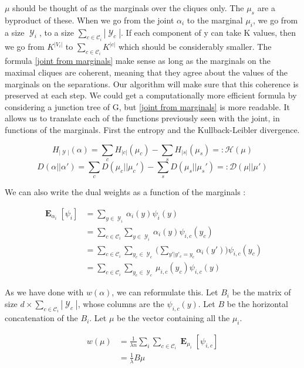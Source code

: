 \documentclass{article}
\DeclareMathOperator{\E}{\mathbf{E}}
\DeclareMathOperator{\Y}{\mathcal{Y}}
\begin{document}
$\mu$ should be thought of as the marginals over the cliques only. The $\mu_s$ are a byproduct of these. When we go from the joint $\alpha_i$ to the marginal $\mu_i$, we go from a size $\Y_i$, to a size $\sum_{c \in \mathcal C_i} |\Y_c|$. If each component of y can take K values, then we go from $K^{|V_i|}$ to $\sum_{c \in \mathcal C_i} K^{|c|}$ which should be considerably smaller.
The formula \ref{joint from marginals} make sense as long as the marginals on the maximal cliques are coherent, meaning that they agree about the values of the marginals on the separations. Our algorithm will make sure that this coherence is preserved at each step.
 We could get a computationally more efficient formula by considering a junction tree of G, but  \ref{joint from marginals} is more readable. It allows us to translate each of the functions previously seen with the joint, in functions of the marginals. First the entropy and the Kullback-Leibler divergence.

\begin{equation}
	H_{|\Y|} (\alpha) = \sum_c H_{|c|}(\mu_c) - \sum_s H_{|s|}(\mu_s) =: \mathcal H (\mu) 
	\label{marginals entropy}
\end{equation}
\begin{equation}
	D(\alpha||\alpha') = \sum_c D(\mu_c||\mu_c') - \sum_s D(\mu_s||\mu_s') =: \mathcal D (\mu||\mu')
\end{equation}

We can also write the dual weights as a function of the marginals :

\begin{align*}
	   \E_{\alpha_i}[\psi_i]
   & = \sum_{y \in \Y_i} \alpha_i(y) \psi_i(y)  \\
   &  = \sum_{c \in \mathcal C_i} \sum_{y \in \Y_i}  \alpha_i(y)  \psi_{i, c}(y_c)  \\
   & = \sum_{c \in \mathcal C_i}\sum_{y_c \in  \Y_c} \bigg ( \sum_{y'| y'_c = y_c } \alpha_i(y') \bigg ) \psi_{i, c}(y_c) \\
   & = \sum_{c \in \mathcal C_i}\sum_{y_c \in \Y_c} \mu_{i, c}(y_c)  \psi_{i, c}(y)
\end{align*}

As we have done with $w(\alpha)$, we can reformulate this. Let  $B_i$ be the matrix of size $d \times  \sum_{c \in \mathcal C_i} |\Y_c|$, whose columns are the $\psi_{i, c}(y)$. Let $B$ be the horizontal concatenation of the $B_i$. Let $\mu$ be the vector containing all the $\mu_i$.

\begin{align}
	w (\mu)
	& =\frac{1}{\lambda n} \sum_i \sum_{c \in \mathcal C_i} \E_{\mu_i}[\psi_{i, c}] \\
	& = \frac{1}{\lambda} B\mu \label{marginals to primal}
\end{align}
\end{document}
